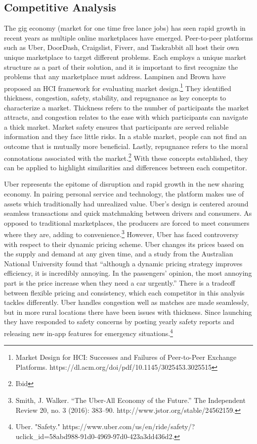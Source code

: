 \subsection{Competitive Analysis}

The gig economy (market for one time free lance jobs) has seen rapid growth in recent years as multiple online marketplaces have emerged. Peer-to-peer platforms such as Uber, DoorDash, Craigslist, Fiverr, and Taskrabbit all host their own unique marketplace to target different problems. Each employs a unique market structure as a part of their solution, and it is important to first recognize the problems that any marketplace must address. Lampinen and Brown have proposed an HCI framework for evaluating market design.\footnote{Market Design for HCI: Successes and Failures of Peer-to-Peer Exchange Platforms. https://dl.acm.org/doi/pdf/10.1145/3025453.3025515} They identified thickness, congestion, safety, stability, and repugnance as key concepts to characterize a market. Thickness refers to the number of participants the market attracts, and congestion relates to the ease with which participants can navigate a thick market. Market safety ensures that participants are served reliable information and they face little risks. In a stable market, people can not find an outcome that is mutually more beneficial. Lastly, repugnance refers to the moral connotations associated with the market.\footnote{Ibid} With these concepts established, they can be applied to highlight similarities and differences between each competitor. 
 
Uber represents the epitome of disruption and rapid growth in the new sharing economy. In pairing personal service and technology, the platform makes use of assets which traditionally had unrealized value. Uber’s design is centered around seamless transactions and quick matchmaking between drivers and consumers. As opposed to traditional marketplaces, the producers are forced to meet consumers where they are, adding to convenience.\footnote{Smith, J. Walker. “The Uber-All Economy of the Future.” The Independent Review 20, no. 3 (2016): 383–90. http://www.jstor.org/stable/24562159.} However, Uber has faced controversy with respect to their dynamic pricing scheme. Uber changes its prices based on the supply and demand at any given time, and a study from the Australian National University found that  “although a dynamic pricing strategy improves efficiency, it is incredibly annoying. In the passengers’ opinion, the most annoying part is the price increase when they need a car urgently.” There is a tradeoff between flexible pricing and consistency, which each competitor in this analysis tackles differently. Uber handles congestion well as matches are made seamlessly, but in more rural locations there have been issues with thickness. Since launching they have responded to safety concerns by posting yearly safety reports and releasing new in-app features for emergency situations.\footnote{Uber. "Safety." https://www.uber.com/us/en/ride/safety/?uclick_id=58abd988-91d0-4969-97d0-423a3dd436d2.}

